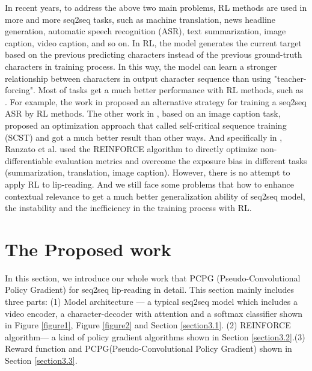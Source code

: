 \documentclass{bmvc2k}
\begin{document}
	In recent years, to address the above two main problems, RL methods are used in more and more seq2seq tasks, such as machine translation, news headline generation, automatic speech recognition (ASR), text summarization, image caption, video caption, and so on\cite{Chen2014}. In RL, the model generates the current target based on the previous predicting characters instead of the previous ground-truth characters in training process. In this way, the model can learn a stronger relationship between characters in output character sequence than using "teacher-forcing". Most of tasks get a much better performance with RL methods, such as  \cite{Tjandra2017,Rennie,Chopra2016,Shen,Wang,Ren2017,Pasunuru2017,Li2018,McConnell2002}. For example, the work in \cite{Tjandra2017} proposed an alternative strategy for training a seq2seq ASR by  RL methods. The other work in \cite{Rennie}, based on an image caption task, proposed an optimization approach that called self-critical sequence training (SCST) and got a much better result than other ways. And specifically in \cite{Chopra2016}, Ranzato et al. used the REINFORCE algorithm\cite{Willia1992} to directly optimize non-differentiable evaluation metrics and overcome the exposure bias in different tasks (summarization, translation, image caption). However, there is no attempt to apply RL to lip-reading. And we still face some problems that how to enhance contextual relevance to get a much better generalization ability of seq2seq model, the instability and the inefficiency in the training process with RL.
	\vspace{-0.5cm}
	\section{The Proposed work}
	\label{sec:Pro}
	\vspace{-0.3cm}
	In this section, we introduce our whole work that PCPG (Pseudo-Convolutional Policy Gradient) for seq2seq lip-reading in detail. 
	This section mainly includes three parts: (1) Model architecture --- a typical seq2seq model which includes a video encoder, a character-decoder with attention and a softmax classifier shown in Figure \ref{figure1}, Figure \ref{figure2} and Section \ref{section3.1}. (2) REINFORCE algorithm--- a kind of policy gradient algorithms shown in Section \ref{section3.2}.(3) Reward function and PCPG(Pseudo-Convolutional Policy Gradient) shown in Section \ref{section3.3}.
	\vspace{-0.4cm}
\end{document}

